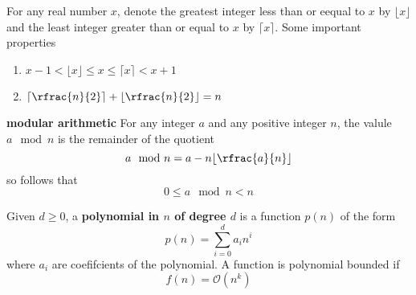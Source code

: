 \documentclass[11pt]{article}
\begin{document}
\begin{defn*}
  For any real number $x$, denote the greatest integer less than or eequal to $x$  by $\lfloor x \rfloor$ and the least integer greater than or equal to $x$ by $\lceil x \rceil$. Some important properties
  \begin{enumerate}
    \item $x - 1 < \lfloor x \rfloor \leq x \leq \lceil x \rceil < x+1$
    \item $\lceil \rfrac{n}{2} \rceil + \lfloor \rfrac{n}{2}\rfloor = n$
  \end{enumerate}
\end{defn*}

\begin{defn*}
  \textbf{modular arithmetic} For any integer $a$ and any positive integer $n$, the valule $a \mod n$ is the remainder of the quotient
  \[
    a\mod n = a - n \lfloor \rfrac{a}{n} \rfloor
  \]
  so follows that
  \[
    0 \leq a\mod n < n
  \]
\end{defn*}

\begin{defn*}
  Given $d \geq 0$, a \textbf{polynomial in $n$ of degree $d$} is a function $p(n)$ of the form
  \[
    p(n) = \sum_{i=0}^{d} a_i n^i
  \]
  where $a_i$ are coefifcients of the polynomial. A function is polynomial bounded if
  \[
    f(n) = \mathcal{O}(n^k)
  \]
\end{defn*}
\end{document}
